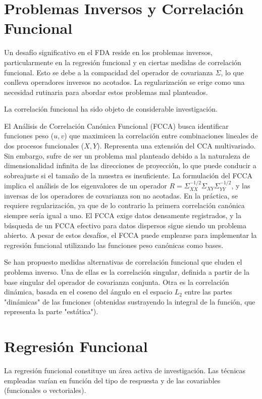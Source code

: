 \documentclass{article}
\begin{document}
\section*{\large Problemas Inversos y Correlación Funcional}
Un desafío significativo en el FDA reside en los problemas inversos, particularmente en la regresión funcional y en ciertas medidas de correlación funcional. Esto se debe a la compacidad del operador de covarianza $\Sigma$, lo que conlleva operadores inversos no acotados. La regularización se erige como una necesidad rutinaria para abordar estos problemas mal planteados.

\vspace{0.35cm}\noindent
La correlación funcional ha sido objeto de considerable investigación.

\vspace{0.35cm}\noindent
El Análisis de Correlación Canónica Funcional (FCCA) busca identificar funciones peso ($u, v$) que maximicen la correlación entre combinaciones lineales de dos procesos funcionales ($X, Y$). Representa una extensión del CCA multivariado. Sin embargo, sufre de ser un problema mal planteado debido a la naturaleza de dimensionalidad infinita de las direcciones de proyección, lo que puede conducir a sobreajuste si el tamaño de la muestra es insuficiente. La formulación del FCCA implica el análisis de los eigenvalores de un operador $R = \Sigma_{XX}^{-1/2} \Sigma_{XY} \Sigma_{YY}^{-1/2}$, y las inversas de los operadores de covarianza son no acotadas. En la práctica, se requiere regularización, ya que de lo contrario la primera correlación canónica siempre sería igual a uno. El FCCA exige datos densamente registrados, y la búsqueda de un FCCA efectivo para datos dispersos sigue siendo un problema abierto. A pesar de estos desafíos, el FCCA puede emplearse para implementar la regresión funcional utilizando las funciones peso canónicas como bases.

\vspace{0.35cm}\noindent
Se han propuesto medidas alternativas de correlación funcional que eluden el problema inverso. Una de ellas es la correlación singular, definida a partir de la base singular del operador de covarianza conjunta. Otra es la correlación dinámica, basada en el coseno del ángulo en el espacio $L_2$ entre las partes "dinámicas" de las funciones (obtenidas sustrayendo la integral de la función, que representa la parte "estática").

\section*{\large Regresión Funcional}
La regresión funcional constituye un área activa de investigación. Las técnicas empleadas varían en función del tipo de respuesta y de las covariables (funcionales o vectoriales).
\end{document}
